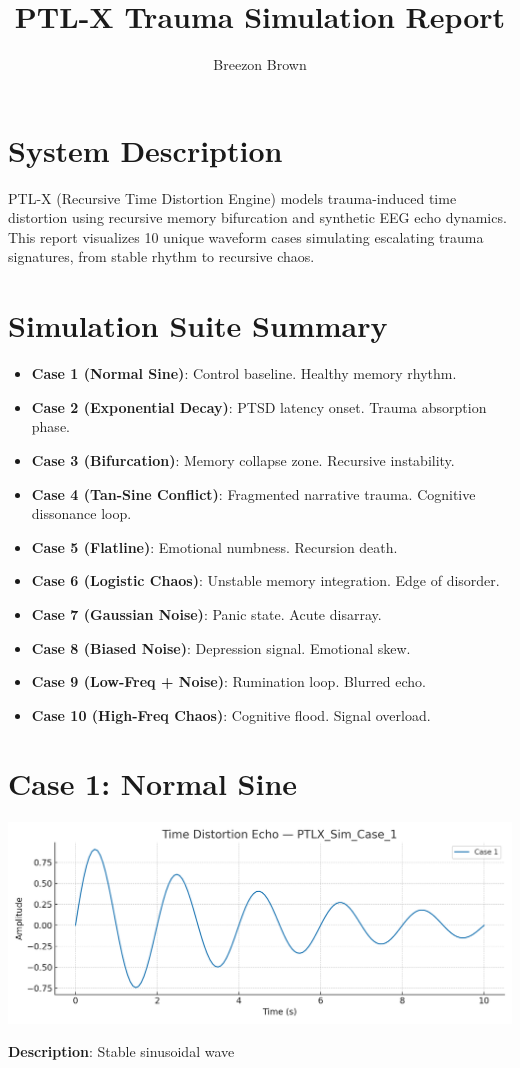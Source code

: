 \documentclass[12pt]{article}
\title{PTL-X Trauma Simulation Report}
\author{Breezon Brown}
\date{}
\begin{document}
\maketitle

\section*{System Description}
PTL-X (Recursive Time Distortion Engine) models trauma-induced time distortion using recursive memory bifurcation and synthetic EEG echo dynamics. This report visualizes 10 unique waveform cases simulating escalating trauma signatures, from stable rhythm to recursive chaos.

\section*{Simulation Suite Summary}
\begin{itemize}
  \item \textbf{Case 1 (Normal Sine)}: Control baseline. Healthy memory rhythm.
  \item \textbf{Case 2 (Exponential Decay)}: PTSD latency onset. Trauma absorption phase.
  \item \textbf{Case 3 (Bifurcation)}: Memory collapse zone. Recursive instability.
  \item \textbf{Case 4 (Tan-Sine Conflict)}: Fragmented narrative trauma. Cognitive dissonance loop.
  \item \textbf{Case 5 (Flatline)}: Emotional numbness. Recursion death.
  \item \textbf{Case 6 (Logistic Chaos)}: Unstable memory integration. Edge of disorder.
  \item \textbf{Case 7 (Gaussian Noise)}: Panic state. Acute disarray.
  \item \textbf{Case 8 (Biased Noise)}: Depression signal. Emotional skew.
  \item \textbf{Case 9 (Low-Freq + Noise)}: Rumination loop. Blurred echo.
  \item \textbf{Case 10 (High-Freq Chaos)}: Cognitive flood. Signal overload.
\end{itemize}

\newpage

\section*{Case 1: Normal Sine}
\begin{center}
\includegraphics[width=0.95\linewidth]{PTLX_Sim_Case_1.png}
\end{center}
\textbf{Description}: Stable sinusoidal wave \\
\end{document}
